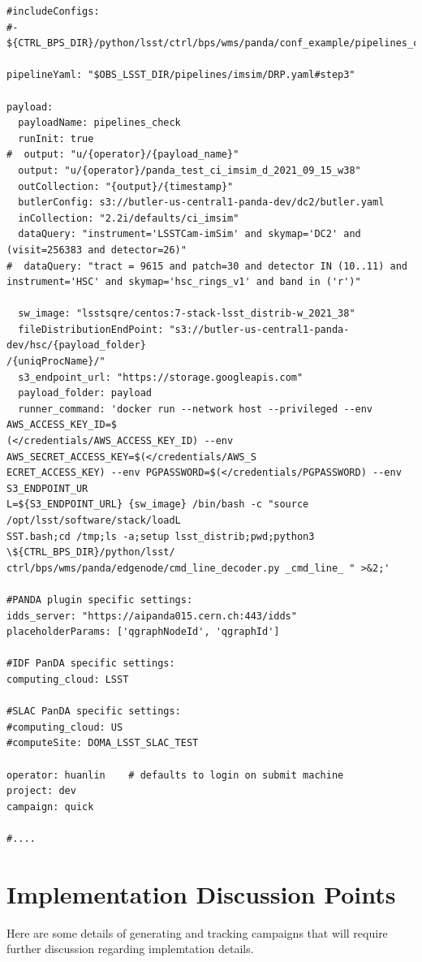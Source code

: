 \documentclass[DM,authoryear,toc]{lsstdoc}
\begin{document}
\begin{verbatim}
#includeConfigs:
#- ${CTRL_BPS_DIR}/python/lsst/ctrl/bps/wms/panda/conf_example/pipelines_check_idf.yaml

pipelineYaml: "$OBS_LSST_DIR/pipelines/imsim/DRP.yaml#step3"

payload:
  payloadName: pipelines_check
  runInit: true
#  output: "u/{operator}/{payload_name}"
  output: "u/{operator}/panda_test_ci_imsim_d_2021_09_15_w38"
  outCollection: "{output}/{timestamp}"
  butlerConfig: s3://butler-us-central1-panda-dev/dc2/butler.yaml
  inCollection: "2.2i/defaults/ci_imsim"
  dataQuery: "instrument='LSSTCam-imSim' and skymap='DC2' and (visit=256383 and detector=26)"
#  dataQuery: "tract = 9615 and patch=30 and detector IN (10..11) and instrument='HSC' and skymap='hsc_rings_v1' and band in ('r')"

  sw_image: "lsstsqre/centos:7-stack-lsst_distrib-w_2021_38"
  fileDistributionEndPoint: "s3://butler-us-central1-panda-dev/hsc/{payload_folder}
/{uniqProcName}/"
  s3_endpoint_url: "https://storage.googleapis.com"
  payload_folder: payload
  runner_command: 'docker run --network host --privileged --env AWS_ACCESS_KEY_ID=$
(</credentials/AWS_ACCESS_KEY_ID) --env AWS_SECRET_ACCESS_KEY=$(</credentials/AWS_S
ECRET_ACCESS_KEY) --env PGPASSWORD=$(</credentials/PGPASSWORD) --env S3_ENDPOINT_UR
L=${S3_ENDPOINT_URL} {sw_image} /bin/bash -c "source /opt/lsst/software/stack/loadL
SST.bash;cd /tmp;ls -a;setup lsst_distrib;pwd;python3 \${CTRL_BPS_DIR}/python/lsst/
ctrl/bps/wms/panda/edgenode/cmd_line_decoder.py _cmd_line_ " >&2;'

#PANDA plugin specific settings:
idds_server: "https://aipanda015.cern.ch:443/idds"
placeholderParams: ['qgraphNodeId', 'qgraphId']

#IDF PanDA specific settings:
computing_cloud: LSST

#SLAC PanDA specific settings:
#computing_cloud: US
#computeSite: DOMA_LSST_SLAC_TEST

operator: huanlin    # defaults to login on submit machine
project: dev
campaign: quick

#....

\end{verbatim}

\section{Implementation Discussion Points}

Here are some details of generating and tracking campaigns that will
require further discussion regarding implemtation details.
\end{document}
